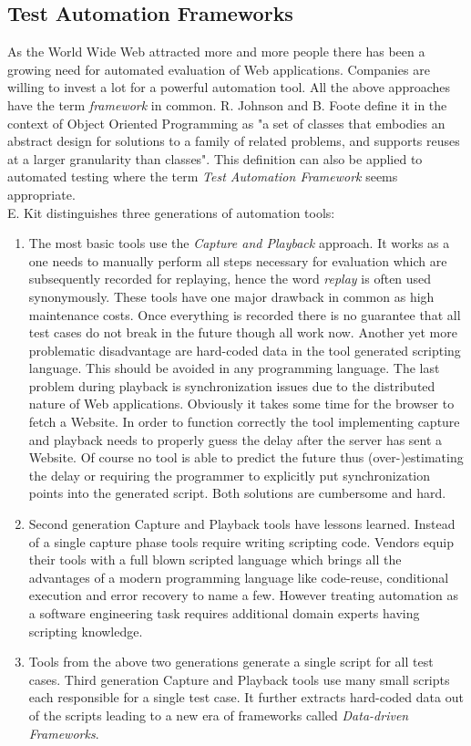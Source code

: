 \documentclass[12pt, notitlepage]{article}
\begin{document}
\subsection{Test Automation Frameworks}
As the World Wide Web attracted more and more people there has been a growing need for automated evaluation of Web applications. Companies are willing to
invest a lot for a powerful automation tool. All the above approaches have the term \textit{framework} in common. R. Johnson and B. Foote define it
in the context of Object Oriented Programming as\cite{oop}
"a set of classes that embodies an abstract design for solutions to a family of related problems, and supports reuses at a larger granularity than classes".
This definition can also be applied to automated testing where the term \textit{Test Automation Framework} seems appropriate.\\
E. Kit\cite{kit} distinguishes three generations of automation tools:
\begin{enumerate}
	\item The most basic tools use the \textit{Capture and Playback} approach. It works as a one needs to manually perform all steps necessary for evaluation which
	are subsequently recorded for replaying, hence the word \textit{replay} is often used synonymously.
	These tools have one major drawback in common as high maintenance costs\cite{record-playback}. Once everything is recorded there is no guarantee that all
	test cases do not break in the future though all work now. Another yet more problematic disadvantage are hard-coded data in the tool generated
	scripting language. This should be avoided in any programming language\cite{automation-principles}. 
	The last problem during playback is synchronization issues due to the distributed nature of Web applications. Obviously it takes some time for the browser to
	fetch a Website. In order to function correctly the tool implementing capture and playback needs to properly guess the delay after the server has sent a Website.
	Of course no tool is able to predict the future thus (over-)estimating the delay or requiring the programmer to explicitly put synchronization points
	into the generated script. Both solutions are cumbersome and hard.
	\item Second generation Capture and Playback tools have lessons learned. Instead of a single capture phase tools require writing scripting code. Vendors 
	equip their tools with a full blown scripted language which brings all the advantages of a modern programming language like code-reuse, conditional execution and
	error recovery to name a few. However treating automation as a software engineering task requires additional domain experts having scripting knowledge.
	\item Tools from the above two generations generate a single script for all test cases. Third generation Capture and Playback tools use many small scripts each 
	responsible for a single test case. It further extracts hard-coded data out of the scripts leading to a new era of frameworks called
	\textit{Data-driven Frameworks}. 
\end{enumerate} 
\end{document}
